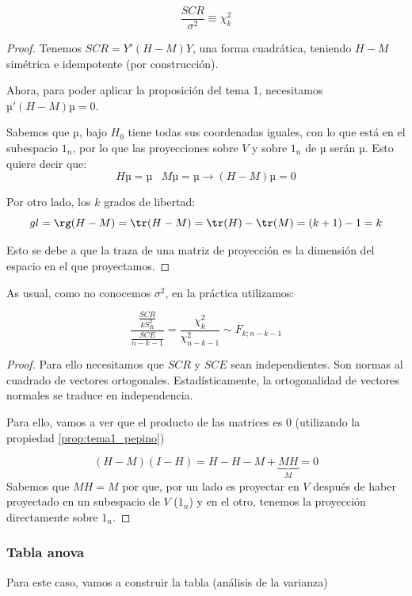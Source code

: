 \begin{prop}[Distribución SCR en $H_0:∀i\;β_i=0$]

\[
\frac{SCR}{σ^2} \equiv \chi^2_{k}
\]
\end{prop}
\begin{proof}
Tenemos $SCR = Y'(H-M)Y$, una forma cuadrática, teniendo $H-M$ simétrica e idempotente (por construcción).

Ahora, para poder aplicar la proposición del tema 1, necesitamos $µ'(H-M)µ = 0$.

Sabemos que $µ$, bajo $H_0$ tiene todas sus coordenadas iguales, con lo que está en el subespacio $1_n$, por lo que las proyecciones sobre $V$ y sobre $1_n$ de $µ$ serán $µ$. Esto quiere decir que:
\[ Hµ = µ \;\;\; Mµ = µ \to (H-M)µ=0\]


Por otro lado, los $k$ grados de libertad:
\[
gl = \rg(H-M) = \tr(H-M) = \tr(H) - \tr(M) = (k+1)-1 = k
\]

Esto se debe a que la traza de una matriz de proyección es la dimensión del espacio en el que proyectamos.

\end{proof}

As usual, como no conocemos $σ^2$, en la práctica utilizamos:
\begin{prop}
\[
\frac{\displaystyle\frac{SCR}{kS_R^2}}{\displaystyle\frac{SCE}{n-k-1}} = \frac{\chi^2_k}{\chi^2_{n-k-1}}\sim F_{k;n-k-1}
\]
\end{prop}
\begin{proof}
Para ello necesitamos que $SCR$ y $SCE$ sean independientes. Son normas al cuadrado de vectores ortogonales. Estadísticamente, la ortogonalidad de vectores normales se traduce en independencia. 

Para ello, vamos a ver que el producto de las matrices es 0 (utilizando la propiedad \ref{prop:tema1_pepino})

\label{prop:SCRIndepSCE}
\[
(H-M)(I-H) = H-H-M+\underbrace{MH}_{M} = 0
\]
Sabemos que $MH=M$ por que, por un lado es proyectar en $V$ después de haber proyectado en un subespacio de $V$ ($1_n$) y en el otro, tenemos la proyección directamente sobre $1_n$.

\end{proof}

\subsubsection{Tabla anova}
Para este caso, vamos a construir la tabla  (análisis de la varianza) 

